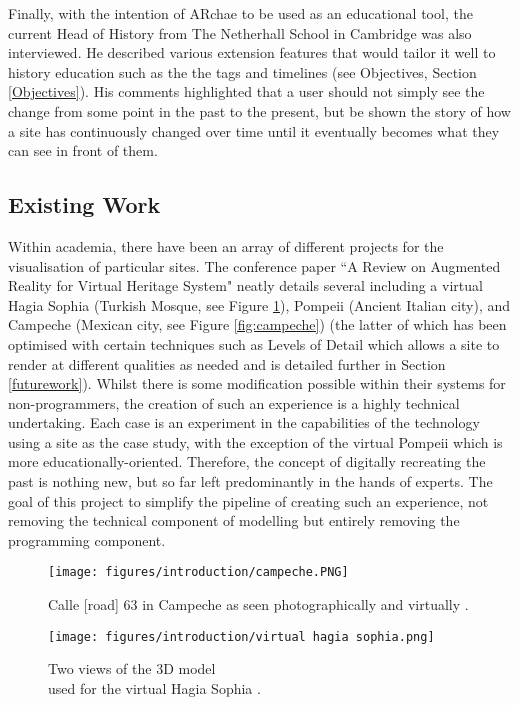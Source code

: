 \documentclass[12pt, a4paper]{article}
\begin{document}
Finally, with the intention of ARchae to be used as an educational tool, the current Head of History from The Netherhall School in Cambridge was also interviewed. He described various extension features that would tailor it well to history education such as the the tags and timelines (see Objectives, Section \ref{Objectives}). His comments highlighted that a user should not simply see the change from some point in the past to the present, but be shown the story of how a site has continuously changed over time until it eventually becomes what they can see in front of them.

\subsection{Existing Work}
\label{existingwork}
Within academia, there have been an array of different projects for the visualisation of particular sites. The conference paper ``A Review on Augmented Reality for Virtual Heritage System" \cite{existing:virtualhertitagereview} neatly details several including a virtual Hagia Sophia \cite{existing:hagia} (Turkish Mosque, see Figure \ref{fig:hagiasophia}), Pompeii \cite{existing:pompeii} (Ancient Italian city), and Campeche 
\cite{existing:campeche} (Mexican city, see Figure \ref{fig:campeche}) (the latter of which has been optimised with certain techniques such as Levels of Detail which allows a site to render at different qualities as needed and is detailed further in Section \ref{futurework}). Whilst there is some modification possible within their systems for non-programmers, the creation of such an experience is a highly technical undertaking. Each case is an experiment in the capabilities of the technology using a site as the case study, with the exception of the virtual Pompeii which is more educationally-oriented. Therefore, the concept of digitally recreating the past is nothing new, but so far left predominantly in the hands of experts. The goal of this project to simplify the pipeline of creating such an experience, not removing the technical component of modelling but entirely removing the programming component.

\begin{figure}[]
\begin{minipage}{.48\textwidth}
  \centering
  \texttt{[image: figures/introduction/campeche.PNG]}
  \caption{Calle [road] 63 in Campeche as seen photographically and virtually \cite{existing:campeche}.}
  \label{fig:campeche}
\end{minipage}
\begin{minipage}{.04\textwidth}
  \hspace{0.1cm}
\end{minipage}
\begin{minipage}{.48\textwidth}
  \centering
  \texttt{[image: figures/introduction/virtual hagia sophia.png]}
  \caption{Two views of the 3D model \\ used for the virtual Hagia Sophia \cite{existing:hagia}.}
  \label{fig:hagiasophia}
\end{minipage}
\end{figure}
\end{document}
